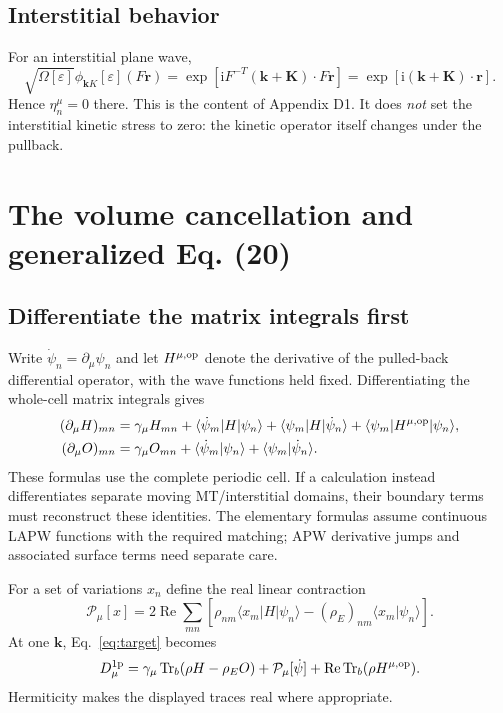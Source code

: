 \documentclass[11pt]{article}
\newcommand{\Tr}{\operatorname{Tr}}
\newcommand{\Rea}{\operatorname{Re}}
\newcommand{\ii}{\mathrm i}
\newcommand{\kb}{\mathbf k}
\newcommand{\pa}{\partial_\mu}
\newcommand{\rE}{{\rho_E}}
\newcommand{\ip}[2]{\langle #1|#2\rangle}
\newcommand{\me}[3]{\langle #1|#2|#3\rangle}
\newcommand{\newpart}[1]{\par\Needspace{12\baselineskip}\section{#1}}
\begin{document}
\subsection{Interstitial behavior}
For an interstitial plane wave,
\begin{equation}
 \sqrt{\Omega[\varepsilon]}\phi_{\kb K}[\varepsilon](F\mathbf r)
 =\exp[\ii F^{-T}(\kb+\mathbf K)\cdot F\mathbf r]
 =\exp[\ii(\kb+\mathbf K)\cdot\mathbf r].
 \label{eq:plane}
\end{equation}
Hence $\eta_n^\mu=0$ there. This is the content of Appendix D1.
It does \emph{not} set the interstitial kinetic stress to zero: the
kinetic operator itself changes under the pullback.

\newpart{The volume cancellation and generalized Eq. (20)}
\label{sec:general20}
\subsection{Differentiate the matrix integrals first}
Write $\dot\psi_n=\pa\psi_n$ and let
$H^{\mu,\rm op}$ denote the derivative of the pulled-back differential
operator, with the wave functions held fixed. Differentiating the
whole-cell matrix integrals gives
\begin{align}
 (\pa H)_{mn}={}&\gamma_\mu H_{mn}
 +\me{\dot\psi_m}{H}{\psi_n}
 +\me{\psi_m}{H}{\dot\psi_n}
 +\me{\psi_m}{H^{\mu,\rm op}}{\psi_n},
 \label{eq:Hprime}\\
 (\pa O)_{mn}={}&\gamma_\mu O_{mn}
 +\ip{\dot\psi_m}{\psi_n}+\ip{\psi_m}{\dot\psi_n}.
 \label{eq:Oprime}
\end{align}
These formulas use the complete periodic cell. If a calculation instead
differentiates separate moving MT/interstitial domains, their boundary
terms must reconstruct these identities. The elementary formulas assume
continuous LAPW functions with the required matching; APW derivative jumps
and associated surface terms need separate care.

For a set of variations $x_n$ define the real linear contraction
\begin{equation}
 \mathcal P_\mu[x]=2\Rea\sum_{mn}\left[
 \rho_{nm}\me{x_m}{H}{\psi_n}
 -(\rE)_{nm}\ip{x_m}{\psi_n}\right].
 \label{eq:Pdef}
\end{equation}
At one $\kb$, Eq.~\eqref{eq:target} becomes
\begin{equation}
 D_\mu^{\rm 1p}=\gamma_\mu\Tr_b(\rho H-\rE O)
                +\mathcal P_\mu[\dot\psi]
                +\Rea\Tr_b(\rho H^{\mu,\rm op}).
 \label{eq:prevolume}
\end{equation}
Hermiticity makes the displayed traces real where appropriate.
\end{document}
